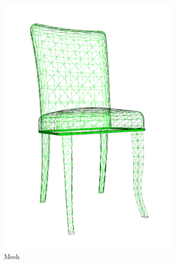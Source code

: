 \begin{figure}[!t]
	\centering
	\hfill
	\begin{subfigure}{0.2\linewidth}
		\includegraphics[width=\linewidth]{Figures/ObjRecog/chair_mesh}
		\caption{Mesh}
		\label{subfig:objrecog:3d_mesh_cloud_grid:mesh}
	\end{subfigure}
	\hfill
	\begin{subfigure}{0.2\linewidth}

\end{subfigure}
\end{figure}

